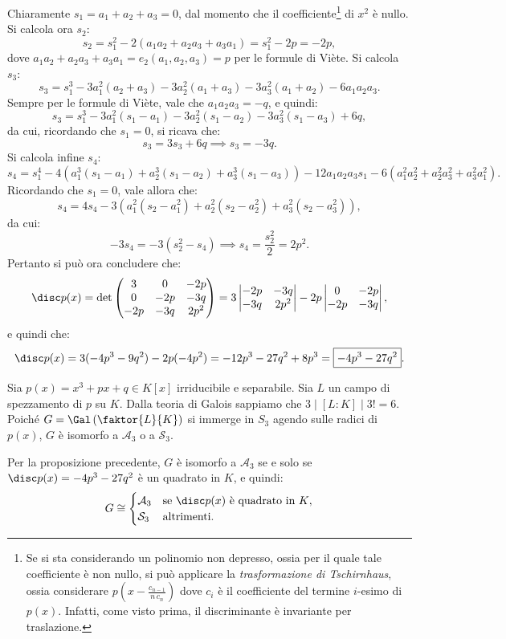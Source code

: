\documentclass[11pt]{scrartcl}
\begin{document}
\begin{remark}
	
	Chiaramente $s_1 = a_1 + a_2 + a_3 = 0$, dal momento che il coefficiente\footnote{
		Se si sta considerando un polinomio non depresso, ossia per il quale tale
		coefficiente è non nullo, si può applicare la \textit{trasformazione di Tschirnhaus},
		ossia considerare $p\left(x - \frac{c_{n-1}}{n \, c_n}\right)$ dove $c_i$ è il coefficiente del termine
		$i$-esimo di $p(x)$. Infatti, come visto prima, il discriminante è invariante
		per traslazione.
	} di $x^2$ è nullo. Si calcola ora $s_2$:
	\[ s_2 = s_1^2 - 2(a_1 a_2 + a_2 a_3 + a_3 a_1) = s_1^2 - 2 p = -2p, \]
	dove $a_1 a_2 + a_2 a_3 + a_3 a_1 = e_2(a_1, a_2, a_3) = p$ per le formule di Viète.
	Si calcola $s_3$:
	\[ s_3 = s_1^3 - 3 a_1^2 (a_2 + a_3) - 3 a_2^2 (a_1 + a_3) - 3 a_3^2 (a_1 + a_2) - 6 a_1 a_2 a_3. \]
	Sempre per le formule di Viète, vale che $a_1 a_2 a_3 = -q$, e quindi:
	\[ s_3 = s_1^3 - 3 a_1^2 (s_1 - a_1) - 3 a_2^2 (s_1 - a_2) - 3 a_3^2 (s_1 - a_3) + 6 q, \]
	da cui, ricordando che $s_1 = 0$, si ricava che:
	\[ s_3 = 3s_3 + 6q \implies s_3 = -3q. \]
	Si calcola infine $s_4$:
	\[  s_4 = s_1^4 - 4(a_1^3(s_1 - a_1) + a_2^3(s_1 - a_2) + a_3^3(s_1 - a_3)) - 12 a_1a_2a_3 s_1 - 6 (a_1^2a_2^2 + a_2^2 a_3^2 + a_3^2 a_1^2). \]
	Ricordando che $s_1 = 0$, vale allora che:
	\[ s_4 = 4s_4 - 3 (a_1^2 (s_2 - a_1^2) + a_2^2 (s_2 - a_2^2) + a_3^2 (s_2 - a_3^2)), \]
	da cui:
	\[ -3 s_4 = - 3(s_2^2 - s_4) \implies s_4 = \frac{s_2^2}{2} = 2p^2. \]
	Pertanto si può ora concludere che:
	\[ \disc p(x) = \det \begin{pmatrix}
		3 & 0 & -2p \\ 0 & -2p & -3q \\ -2p & -3q & 2p^2
	\end{pmatrix} = 3 \begin{vmatrix}
	 -2p & -3q \\ -3q & 2p^2
	\end{vmatrix} -2p \begin{vmatrix}
		0 & -2p \\ -2p & -3q
	\end{vmatrix}, \]
	e quindi che:
	\[ \disc p(x) = 3(-4p^3 - 9q^2) -2p(-4p^2) = -12 p^3 - 27 q^2 + 8p^3 = \boxed{-4p^3 - 27q^2}. \]
\end{remark}

\begin{example}
	Sia $p(x) = x^3 + px + q \in K[x]$ irriducibile e separabile. Sia $L$ un
	campo di spezzamento di $p$ su $K$. Dalla teoria di Galois sappiamo che
	$3 \mid [L : K] \mid 3! = 6$. Poiché $G = \Gal\left(\faktor{L}{K}\right)$ si
	immerge in $S_3$ agendo sulle radici di $p(x)$, $G$ è isomorfo a $\mathcal{A}_3$
	o a $\mathcal{S}_3$. \medskip
	
	
	Per la proposizione precedente, $G$ è isomorfo a $\mathcal{A}_3$ se e solo
	se $\disc p(x) = -4p^3 - 27q^2$ è un quadrato in $K$, e quindi:
	\[ G \cong \begin{cases}
		\mathcal{A}_3 & \text{se $\disc p(x)$ è quadrato in $K$}, \\
		\mathcal{S}_3 & \text{altrimenti}.
	\end{cases} \]  
\end{example}
\end{document}

